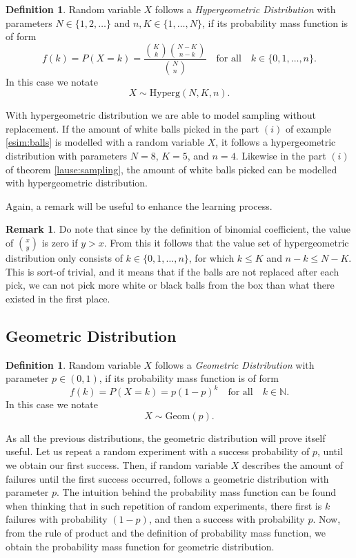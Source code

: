 \documentclass[12pt,a4paper,leqno]{report}
\newcommand{\N}{\mathbb{N}}
\theoremstyle{plain}
\theoremstyle{definition}
\newtheorem{maar}[equation]{Definition}
\newtheorem{remark}[equation]{Remark}
\begin{document}
\begin{maar} 
Random variable $X$ follows a \emph{Hypergeometric Distribution}  with parameters $N \in \{1,2, \dots\}$ and $n,K \in \{1, \dots, N\}$, if its probability mass function is of form 
\[
f(k) = P(X=k) = \frac{\binom{K}{k} \binom{N-K}{n-k}}{\binom{N}{n}} \quad \text{for all} \quad k \in \{0,1, \dots , n\}. 
\]
In this case we notate
\[
X \sim \text{Hyperg}(N,K,n).
\]
\end{maar}

With hypergeometric distribution we are able to model sampling without replacement. If the amount of white balls picked in the part $(i)$ of example \ref{esim:balls} is modelled with a random variable $X$, it follows a hypergeometric distribution with parameters $N = 8$, $K=5$, and $n=4$. Likewise in the part $(i)$ of theorem \ref{lause:sampling}, the amount of white balls picked can be modelled with hypergeometric distribution.

Again, a remark will be useful to enhance the learning process.

\begin{remark}
Do note that since by the definition of binomial coefficient, the value of  $\binom{x}{y}$ is zero if $y>x$. From this it follows that the value set of hypergeometric distribution only consists of $k \in \{0,1, \dots , n\}$, for which $k \leq K$ and $n-k \leq N-K$. This is sort-of trivial, and it means that if the balls are not replaced after each pick, we can not pick more white or black balls from the box than what there existed in the first place.
\end{remark}

\subsection{Geometric Distribution}

\begin{maar}
Random variable $X$ follows a \emph{Geometric Distribution} with parameter $p \in (0,1)$, if its probability mass function is of form
\[
f(k) = P(X=k) = p(1-p)^k \quad \text{for all} \quad k \in \N.
\] 
In this case we notate
\[
X \sim \text{Geom}(p).
\]
\end{maar}

As all the previous distributions, the geometric distribution will prove itself useful. Let us repeat a random experiment with a success probability of $p$, until we obtain our first success. Then, if random variable $X$ describes the amount of failures until the first success occurred, follows a geometric distribution with parameter $p$. The intuition behind the probability mass function can be found when thinking that in such repetition of random experiments, there first is $k$ failures with probability $(1-p)$, and then a success with probability $p$. Now, from the rule of product and the definition of probability mass function, we obtain the probability mass function for geometric distribution.
\end{document}
